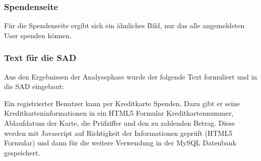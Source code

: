 \begin{frame} %
  \frametitle{Spendenseite} %
	Für die Spendenseite ergibt sich ein ähnliches Bild, nur das alle angemeldeten User spenden können. 
  
\end{frame}

\begin{frame} %
  \frametitle{Text für die SAD} %

  Aus den Ergebnissen der Analysephase wurde der folgende Text formuliert und in die SAD eingebaut:

  \begin{block}{}
	Ein registrierter Benutzer kann per Kreditkarte Spenden. Dazu gibt er seine Kreditkarteninformationen in ein
	HTML5 Formular Kreditkartennummer, Ablaufdatum der Karte, die Prüfziffer und den zu zahlenden Betrag.
	Diese werden mit Javascript auf Richtigkeit der Informationen geprüft (HTML5 Formular) und dann für die
	weitere Verwendung in der MySQL Datenbank gespeichert.
  \end{block}

\end{frame}


